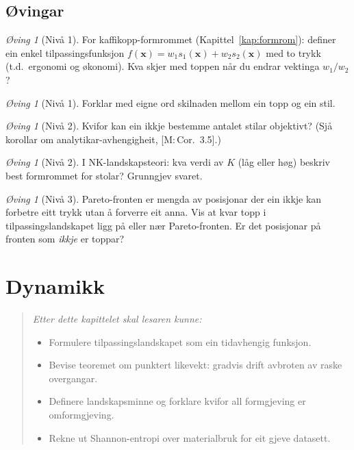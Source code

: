 \documentclass[10pt]{book}
\theoremstyle{definition}
\theoremstyle{plain}
\theoremstyle{remark}
\newtheorem{exercise}[definisjon]{\O{}ving}
\newcommand{\Mref}[1]{\textnormal{[M:\,#1]}}
\begin{document}
\section{\O vingar}

\begin{exercise}[Niv\aa{} 1]\label{ex:3.1}
For kaffikopp-formrommet (Kapittel~\ref{kap:formrom}): definer ein enkel tilpassingsfunksjon $f(\bm{x}) = w_1 s_1(\bm{x}) + w_2 s_2(\bm{x})$ med to trykk (t.d.\ ergonomi og \o konomi). Kva skjer med toppen n\aa r du endrar vektinga $w_1 / w_2$?
\end{exercise}

\begin{exercise}[Niv\aa{} 1]\label{ex:3.2}
Forklar med eigne ord skilnaden mellom ein topp og ein stil.
\end{exercise}

\begin{exercise}[Niv\aa{} 2]\label{ex:3.3}
Kvifor kan ein ikkje bestemme antalet stilar objektivt? (Sj\aa{} korollar om analytikar-avhengigheit, \Mref{Cor.~3.5}.)
\end{exercise}

\begin{exercise}[Niv\aa{} 2]\label{ex:3.4}
I NK-landskapsteori: kva verdi av $K$ (l\aa g eller h\o g) beskriv best formrommet for stolar? Grunngjev svaret.
\end{exercise}

\begin{exercise}[Niv\aa{} 3]\label{ex:3.5}
Pareto-fronten er mengda av posisjonar der ein ikkje kan forbetre eitt trykk utan \aa{} forverre eit anna. Vis at kvar topp i tilpassingslandskapet ligg p\aa{} eller n\ae r Pareto-fronten. Er det posisjonar p\aa{} fronten som \emph{ikkje} er toppar?
\end{exercise}


\chapter{Dynamikk}\label{kap:dynamikk}

\begin{quote}\itshape
Etter dette kapittelet skal lesaren kunne:
\begin{itemize}[nosep]
\item Formulere tilpassingslandskapet som ein tidavhengig funksjon.
\item Bevise teoremet om punktert likevekt: gradvis drift avbroten av raske overgangar.
\item Definere landskapsminne og forklare kvifor all formgjeving er omformgjeving.
\item Rekne ut Shannon-entropi over materialbruk for eit gjeve datasett.
\end{itemize}
\end{quote}
\end{document}
